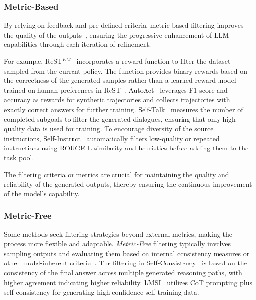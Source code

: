 \documentclass[sn-basic, Numbered]{sn-jnl}%
\theoremstyle{thmstyleone}%
\theoremstyle{thmstyletwo}%
\theoremstyle{thmstylethree}%
\begin{document}
\subsubsection{Metric-Based}
By relying on feedback and pre-defined criteria, metric-based filtering improves the quality of the outputs~\cite{singh2023beyond, qiao2024autoact, ulmer2024bootstrapping, wang2023self}, ensuring the progressive enhancement of LLM capabilities through each iteration of refinement. 

For example, ReST$^{EM}$~\cite{singh2023beyond} incorporates a reward function to filter the dataset sampled from the current policy. The function provides binary rewards based on the correctness of the generated samples rather than a learned reward model trained on human preferences in ReST~\cite{gulcehre2023reinforced}. AutoAct~\cite{qiao2024autoact} leverages F1-score and accuracy as rewards for synthetic trajectories and collects trajectories with exactly correct answers for further training. 
Self-Talk~\cite{ulmer2024bootstrapping} measures the number of completed subgoals to filter the generated dialogues, ensuring that only high-quality data is used for training. To encourage diversity of the source instructions, Self-Instruct~\cite{wang2023self} automatically filters low-quality or repeated instructions using ROUGE-L similarity and heuristics before adding them to the task pool. 

The filtering criteria or metrics are crucial for maintaining the quality and reliability of the generated outputs, thereby ensuring the continuous improvement of the model's capability. 


\subsubsection{Metric-Free}
Some methods seek filtering strategies beyond external metrics, making the process more flexible and adaptable. \textit{Metric-Free} filtering typically involves sampling outputs and evaluating them based on internal consistency measures or other model-inherent criteria~\cite{huang2022large, weng2023self, chen2022codet}. The filtering in Self-Consistency~\cite{wang2023SC} is based on the consistency of the final answer across multiple generated reasoning paths, with higher agreement indicating higher reliability. LMSI~\cite{huang2022large} utilizes CoT prompting plus self-consistency for generating high-confidence self-training data.
\end{document}
